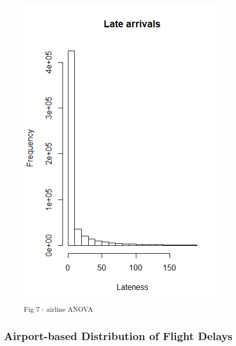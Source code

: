 \documentclass[12pt, a4paper]{book}
\begin{document}
	 		\begin{figure}[h]
	 		\includegraphics[width = 1 \textwidth]{../figures/LateArrivalsHistogram}
	 		\caption{Fig 7 - airline ANOVA}
	 		\end{figure}

		\subsection{Airport-based Distribution of Flight Delays}
			
\end{document}
